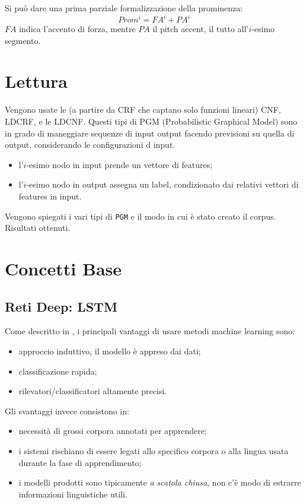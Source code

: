 \documentclass[twoside,twocolumn,11pt]{extarticle}
\theoremstyle{definition}
\begin{document}
	Si può dare una prima parziale formalizzazione della prominenza:
	\begin{equation}
		\label{eq:prom}
		Prom^i = FA^i + PA^i
	\end{equation}
	$FA$ indica l'accento di forza, mentre $PA$ il pitch accent, il tutto all'$i$-esimo segmento.

\section{Lettura \cite{bib:prominence-detection-italian}}
	Vengono usate le (a partire da CRF che captano solo funzioni lineari) CNF, LDCRF, e le LDCNF. Questi tipi di PGM (Probabilistic Graphical Model) sono in grado di maneggiare sequenze di input output facendo previsioni su quella di output, considerando le configurazioni d input.
	\begin{itemize}
		\item l'$i$-esimo nodo in input prende un vettore di features;
		\item l'$i$-esimo nodo in output assegna un label, condizionato dai relativi vettori di features in input.
	\end{itemize}

	Vengono spiegati i vari tipi di \texttt{PGM} e il modo in cui è stato creato il corpus. Risultati ottenuti.

\section{Concetti Base}
	\subsection{Reti Deep: LSTM}
		Come descritto in \cite{bib:prominence-by-acoustic-analyses}, i principali vantaggi di usare metodi machine learning sono:
		\begin{itemize}
			\item approccio induttivo, il modello è appreso dai dati;
			\item classificazione rapida;
			\item rilevatori/classificatori altamente precisi.
		\end{itemize}
		Gli svantaggi invece consistono in:
		\begin{itemize}
			\item necessità di grossi corpora annotati per apprendere;
			\item i sistemi rischiano di essere legati allo specifico corpora o alla lingua usata durante la fase di apprendimento;
			\item i modelli prodotti sono tipicamente \textit{a scatola chiusa}, non c'è modo di estrarre informazioni linguistiche utili.
		\end{itemize}
		
\end{document}
